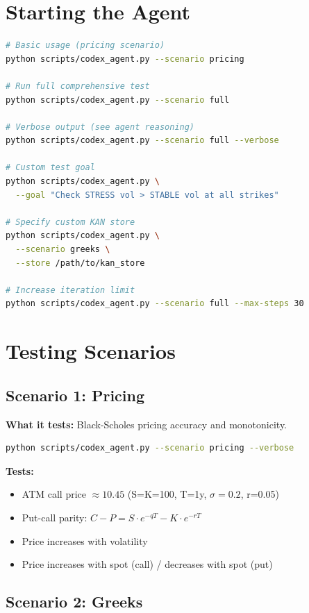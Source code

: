 \documentclass[12pt,oneside,openany]{book}
\begin{document}
\section{Starting the Agent}

\begin{lstlisting}[language=bash]
# Basic usage (pricing scenario)
python scripts/codex_agent.py --scenario pricing

# Run full comprehensive test
python scripts/codex_agent.py --scenario full

# Verbose output (see agent reasoning)
python scripts/codex_agent.py --scenario full --verbose

# Custom test goal
python scripts/codex_agent.py \
  --goal "Check STRESS vol > STABLE vol at all strikes"

# Specify custom KAN store
python scripts/codex_agent.py \
  --scenario greeks \
  --store /path/to/kan_store

# Increase iteration limit
python scripts/codex_agent.py --scenario full --max-steps 30
\end{lstlisting}

\section{Testing Scenarios}

\subsection{Scenario 1: Pricing}

\textbf{What it tests:} Black-Scholes pricing accuracy and monotonicity.

\begin{lstlisting}[language=bash]
python scripts/codex_agent.py --scenario pricing --verbose
\end{lstlisting}

\textbf{Tests:}
\begin{itemize}
    \item ATM call price $\approx 10.45$ (S=K=100, T=1y, $\sigma=0.2$, r=0.05)
    \item Put-call parity: $C - P = S \cdot e^{-qT} - K \cdot e^{-rT}$
    \item Price increases with volatility
    \item Price increases with spot (call) / decreases with spot (put)
\end{itemize}

\subsection{Scenario 2: Greeks}
\end{document}
